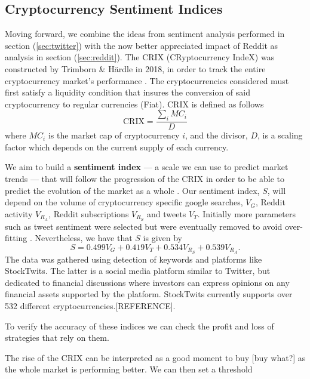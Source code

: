\documentclass[twoside]{report}
\begin{document}
\begin{spacing}{1}
\section{Cryptocurrency Sentiment Indices}
Moving forward, we combine the ideas from sentiment analysis performed in section (\ref{sec:twitter}) with the now better appreciated impact of Reddit as analysis in section (\ref{sec:reddit}). The CRIX (CRyptocurrency IndeX) was constructed by Trimborn \& Härdle in 2018, in order to track the entire cryptocurrency market's performance \cite{trimborn_hardle}. The cryptocurrencies considered must first satisfy a liquidity condition that insures the conversion of said cryptocurrency to regular currencies (Fiat).
CRIX is defined as follows
\[\textrm{CRIX} =\frac{\sum_i MC_i}{D}\]
where $MC_i$ is the market cap of cryptocurrency $i$, and the divisor, $D$, is a scaling factor which depends on the current supply of each currency. 

We aim to build a \textbf{sentiment index} --- a scale we can use to predict market trends --- that will follow the progression of the CRIX in order to be able to predict the evolution of the market as a whole \cite{Crix}.
Our sentiment index, $S$, will depend on the volume of cryptocurrency specific google searches, $V_G$, Reddit activity $V_{R_A}$, Reddit subscriptions $V_{R_S}$ and tweets $V_T$. Initially more parameters such as tweet sentiment were selected but were eventually removed to avoid over-fitting \cite{Crix}. Nevertheless, we have that $S$ is given by
\[S=0.499 V_{G}+ 0.419V_{T} + 0.534 V_{R_S}
+ 0.539V_{R_A}.\]
The data was gathered using detection of keywords and platforms like StockTwits. The latter is a social media platform similar to Twitter, but dedicated to financial discussions where investors can express opinions on any financial assets supported by the platform. StockTwits currently
supports over 532 different cryptocurrencies.[REFERENCE].

To verify the accuracy of these indices we can check the profit and loss of strategies that rely on them. 

\begin{strategy}[CRIX]
 The rise of the CRIX can be interpreted as a good moment to buy [buy what?] as the whole market is performing better. We can then set a threshold 
\end{strategy}\label{strat:sent} 


\end{spacing}
\end{document}
